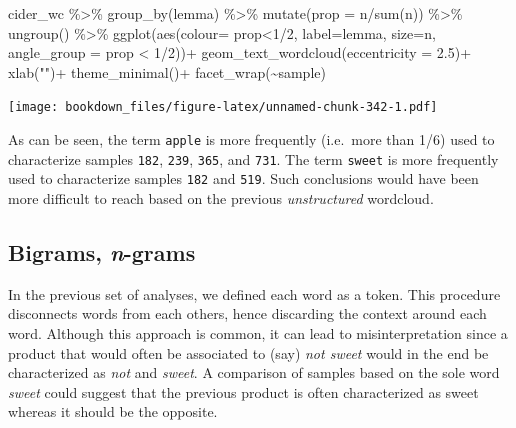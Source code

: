 \documentclass[
]{krantz}
\makeatletter
\newenvironment{Shaded}{\begin{snugshade}}{\end{snugshade}}
\newcommand{\AttributeTok}[1]{\textcolor[rgb]{0.61,0.61,0.61}{#1}}
\newcommand{\DecValTok}[1]{\textcolor[rgb]{0.06,0.06,0.06}{#1}}
\newcommand{\FloatTok}[1]{\textcolor[rgb]{0.06,0.06,0.06}{#1}}
\newcommand{\FunctionTok}[1]{\textcolor[rgb]{0,0,0}{#1}}
\newcommand{\NormalTok}[1]{#1}
\newcommand{\SpecialCharTok}[1]{\textcolor[rgb]{0,0,0}{#1}}
\newcommand{\StringTok}[1]{\textcolor[rgb]{0.5,0.5,0.5}{#1}}
\newenvironment{kframe}{%
\medskip{}
\setlength{\fboxsep}{.8em}
 \def\at@end@of@kframe{}%
 \ifinner\ifhmode%
  \def\at@end@of@kframe{\end{minipage}}%
  \begin{minipage}{\columnwidth}%
 \fi\fi%
 \def\FrameCommand##1{\hskip\@totalleftmargin \hskip-\fboxsep
 \colorbox{shadecolor}{##1}\hskip-\fboxsep
     \hskip-\linewidth \hskip-\@totalleftmargin \hskip\columnwidth}%
 \MakeFramed {\advance\hsize-\width
   \@totalleftmargin\z@ \linewidth\hsize
   \@setminipage}}%
 {\par\unskip\endMakeFramed%
 \at@end@of@kframe}
\renewenvironment{Shaded}{\begin{kframe}}{\end{kframe}}
\makeatother
\begin{document}
\begin{Shaded}
\begin{Highlighting}[]
\NormalTok{cider\_wc }\SpecialCharTok{\%\textgreater{}\%} 
  \FunctionTok{group\_by}\NormalTok{(lemma) }\SpecialCharTok{\%\textgreater{}\%} 
  \FunctionTok{mutate}\NormalTok{(}\AttributeTok{prop =}\NormalTok{ n}\SpecialCharTok{/}\FunctionTok{sum}\NormalTok{(n)) }\SpecialCharTok{\%\textgreater{}\%} 
  \FunctionTok{ungroup}\NormalTok{() }\SpecialCharTok{\%\textgreater{}\%} 
  \FunctionTok{ggplot}\NormalTok{(}\FunctionTok{aes}\NormalTok{(}\AttributeTok{colour=}\NormalTok{ prop}\SpecialCharTok{\textless{}}\DecValTok{1}\SpecialCharTok{/}\DecValTok{2}\NormalTok{, }\AttributeTok{label=}\NormalTok{lemma, }\AttributeTok{size=}\NormalTok{n, }
             \AttributeTok{angle\_group =}\NormalTok{ prop }\SpecialCharTok{\textless{}} \DecValTok{1}\SpecialCharTok{/}\DecValTok{2}\NormalTok{))}\SpecialCharTok{+}
  \FunctionTok{geom\_text\_wordcloud}\NormalTok{(}\AttributeTok{eccentricity =} \FloatTok{2.5}\NormalTok{)}\SpecialCharTok{+}
  \FunctionTok{xlab}\NormalTok{(}\StringTok{""}\NormalTok{)}\SpecialCharTok{+}
  \FunctionTok{theme\_minimal}\NormalTok{()}\SpecialCharTok{+}
  \FunctionTok{facet\_wrap}\NormalTok{(}\SpecialCharTok{\textasciitilde{}}\NormalTok{sample)}
\end{Highlighting}
\end{Shaded}

\texttt{[image: bookdown\_files/figure-latex/unnamed-chunk-342-1.pdf]}

As can be seen, the term \texttt{apple} is more frequently (i.e.~more than 1/6) used to characterize samples \texttt{182}, \texttt{239}, \texttt{365}, and \texttt{731}. The term \texttt{sweet} is more frequently used to characterize samples \texttt{182} and \texttt{519}. Such conclusions would have been more difficult to reach based on the previous \emph{unstructured} wordcloud.

\hypertarget{bigrams-n-grams}{%
\subsection{\texorpdfstring{Bigrams, \emph{n}-grams}{Bigrams, n-grams}}\label{bigrams-n-grams}}

In the previous set of analyses, we defined each word as a token. This procedure disconnects words from each others, hence discarding the context around each word. Although this approach is common, it can lead to misinterpretation since a product that would often be associated to (say) \emph{not sweet} would in the end be characterized as \emph{not} and \emph{sweet}. A comparison of samples based on the sole word \emph{sweet} could suggest that the previous product is often characterized as sweet whereas it should be the opposite.
\end{document}
